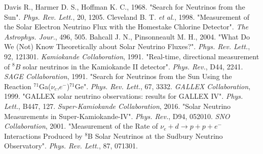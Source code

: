 \documentclass[english]{article}
\begin{document}
\begin{thebibliography}{99}
    Davis R., Harmer D. S., Hoffman K. C., 1968. "Search for Neutrinos from the Sun". \textit{Phys. Rev. Lett.}, 20, 1205.
    Cleveland B. T. \textit{et al.}, 1998. "Measurement of the Solar Electron Neutrino Flux with the Homestake Chlorine Detector". \textit{The Astrophys. Jour.}, 496, 505.
    Bahcall J. N., Pinsonneault M. H., 2004. "What Do We (Not) Know Theoretically about Solar Neutrino Fluxes?". \textit{Phys. Rev. Lett.}, 92, 121301.
    \textit{Kamiokande Collaboration}, 1991. "Real-time, directional measurement of ${}^{8} B$ solar neutrinos in the Kamiokande II detector". \textit{Phys. Rev.}, D44, 2241.
    \textit{SAGE Collaboration}, 1991. "Search for Neutrinos from the Sun Using the Reaction ${}^{71}$Ga($\nu_{e}$,$e^{-}$)${}^{71}$Ge". \textit{Phys. Rev. Lett.}, 67, 3332.
    \textit{GALLEX Collaboration}, 1999. "GALLEX solar neutrino observations: results for GALLEX IV". \textit{Phys. Lett.}, B447, 127.
    \textit{Super-Kamiokande Collaboration}, 2016. "Solar Neutrino Measurements in Super-Kamiokande-IV". \textit{Phys. Rev.}, D94, 052010.
    \textit{SNO Collaboration}, 2001. "Measurement of the Rate of $\nu_{e} +d \rightarrow p+p+e^{-}$ Interactions Produced by ${}^{8}$B Solar Neutrinos at the Sudbury Neutrino Observatory". \textit{Phys. Rev. Lett.}, 87, 071301.
    
\end{thebibliography}
\end{document}
